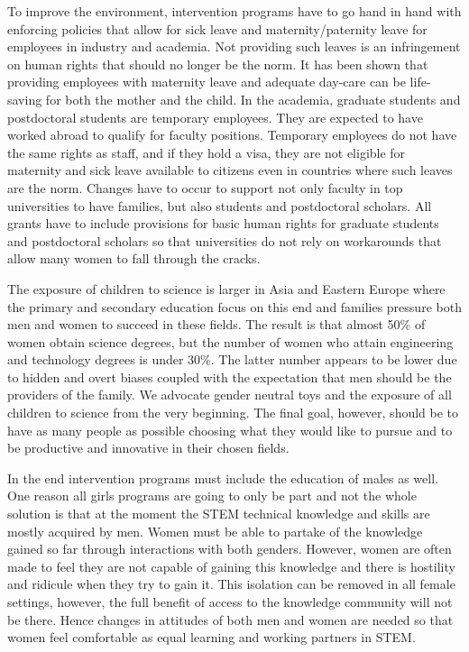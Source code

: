 \documentclass[utf8]{frontiersSCNS} %
\begin{document}
To improve the environment, intervention programs have to go hand in hand with enforcing policies that allow for sick leave and maternity/paternity leave for employees in industry and academia.  Not providing such leaves is an infringement on human rights that should no longer be the norm. It has been shown that providing employees with maternity leave and adequate day-care can be life-saving for both the mother and the child. In the academia, graduate students and postdoctoral students are temporary employees. They are expected to have worked abroad to qualify for faculty positions. Temporary employees do not have the same rights as staff, and if they hold a visa, they are not eligible for maternity and sick leave available to citizens even in countries where such leaves are the norm. Changes have to occur to support not only faculty in top universities to have families, but also students and postdoctoral scholars. All grants have to include provisions for basic human rights for graduate students and postdoctoral scholars so that universities do not rely on workarounds that allow many women to fall through the cracks.

The exposure of children to science is larger in Asia and Eastern Europe where the primary and secondary education focus on this end and families pressure both men and women to succeed in these fields. The result is that almost 50\% of women obtain science degrees, but the number of women who attain engineering and technology degrees is under 30\%. The latter number appears to be lower due to hidden and overt biases coupled with the expectation that men should be the providers of the family. We advocate gender neutral toys and the exposure of all children to science from the very beginning. The final goal, however, should be to have as many people as possible choosing what they would like to pursue and to be productive and innovative in their chosen fields. 

In the end intervention programs must include the education of males as well. One reason all girls programs are going to only be part and not the whole solution is that at the moment the STEM technical knowledge and skills are mostly acquired by men. Women must be able to partake of the knowledge gained so far through interactions with both genders. However, women are often made to feel they are not capable of gaining this knowledge and there is hostility and ridicule when they try to gain it. This isolation can be removed in all female settings, however, the full benefit of access to the knowledge community will not be there. Hence changes in attitudes of both men and women are needed so that women feel comfortable as equal learning and working partners in STEM.
\end{document}
